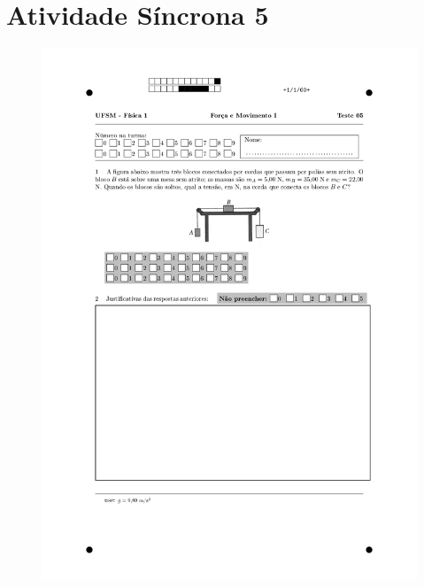 \section{Atividade Síncrona 5} \label{ch:orp1e5}
\vspace*{\fill}
\begin{figure}[H]\centering
\includegraphics[scale=0.7]{fig/orp1q4_page-0001.jpg}
\end{figure}
\vspace*{\fill}
